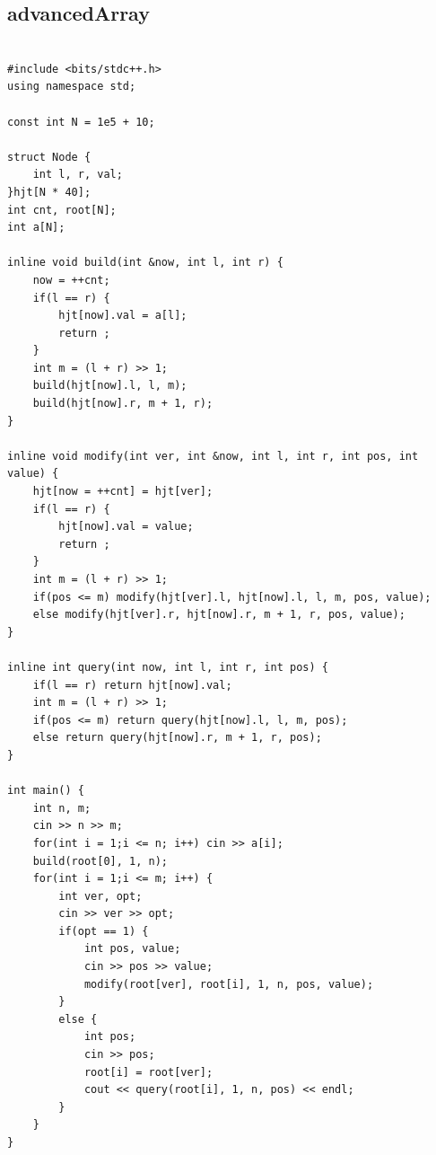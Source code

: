 \documentclass[twoside]{article}
\begin{document}
\subsection{advancedArray}
\begin{lstlisting}

#include <bits/stdc++.h>
using namespace std;

const int N = 1e5 + 10;

struct Node {
    int l, r, val;
}hjt[N * 40];
int cnt, root[N];
int a[N];

inline void build(int &now, int l, int r) {
    now = ++cnt;
    if(l == r) {
        hjt[now].val = a[l];
        return ;
    }
    int m = (l + r) >> 1;
    build(hjt[now].l, l, m);
    build(hjt[now].r, m + 1, r);
}

inline void modify(int ver, int &now, int l, int r, int pos, int value) {
    hjt[now = ++cnt] = hjt[ver];
    if(l == r) {
        hjt[now].val = value;
        return ;
    }
    int m = (l + r) >> 1;
    if(pos <= m) modify(hjt[ver].l, hjt[now].l, l, m, pos, value);
    else modify(hjt[ver].r, hjt[now].r, m + 1, r, pos, value);
}

inline int query(int now, int l, int r, int pos) {
    if(l == r) return hjt[now].val;
    int m = (l + r) >> 1;
    if(pos <= m) return query(hjt[now].l, l, m, pos);
    else return query(hjt[now].r, m + 1, r, pos); 
}

int main() {
    int n, m;
    cin >> n >> m;
    for(int i = 1;i <= n; i++) cin >> a[i];
    build(root[0], 1, n);
    for(int i = 1;i <= m; i++) {
        int ver, opt;
        cin >> ver >> opt;
        if(opt == 1) {
            int pos, value;
            cin >> pos >> value;
            modify(root[ver], root[i], 1, n, pos, value);
        }
        else {
            int pos;
            cin >> pos;
            root[i] = root[ver];
            cout << query(root[i], 1, n, pos) << endl;
        }
    }
}\end{lstlisting}
\end{document}
